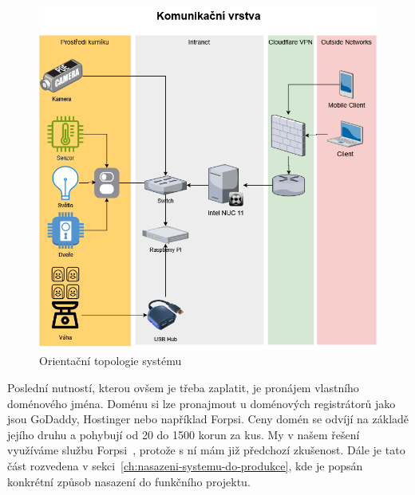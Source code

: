 \begin{figure}[H]
    \centering
    \includegraphics[width=\textwidth]{img/orientacni_topologie}
    \caption{Orientační topologie systému}
    \label{fig:orientacni_topologie}
\end{figure}


\newline
Poslední nutností, kterou ovšem je třeba zaplatit, je pronájem vlastního doménového jména.
Doménu si lze pronajmout u doménových registrátorů jako jsou GoDaddy, Hostinger nebo například Forpsi.
Ceny domén se odvíjí na základě jejího druhu a pohybují od 20 do 1500 korun za kus.
My v našem řešení využíváme službu Forpsi~\cite{forpsi}, protože s ní mám již předchozí zkušenost.\newline
Dále je tato část rozvedena v sekci~\ref{ch:nasazeni-systemu-do-produkce}, kde je popsán konkrétní způsob nasazení do funkčního projektu.



